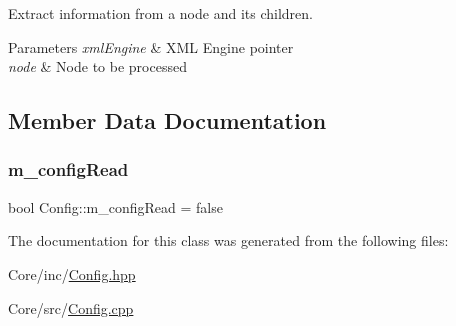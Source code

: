 Extract information from a node and its children. 


\begin{DoxyParams}{Parameters}
{\em xml\+Engine} & X\+ML Engine pointer \\
\hline
{\em node} & Node to be processed \\
\hline
\end{DoxyParams}


\subsection{Member Data Documentation}
\mbox{\label{class_config_a82bcc998ae058699369aee4a189f0ad1}} 
\subsubsection{\texorpdfstring{m\+\_\+config\+Read}{m\_configRead}}
{\footnotesize\ttfamily bool Config\+::m\+\_\+config\+Read = false\hspace{0.3cm}{\ttfamily [private]}}



The documentation for this class was generated from the following files\+:\begin{DoxyCompactItemize}
\item 
Core/inc/\hyperlink{_config_8hpp}{Config.\+hpp}\item 
Core/src/\hyperlink{_config_8cpp}{Config.\+cpp}\end{DoxyCompactItemize}
